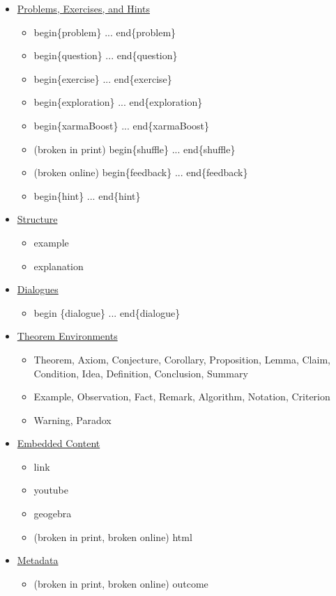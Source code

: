 \documentclass{ximera}
\begin{document}
\begin{remark}
\begin{itemize}
\begin{itemize}
  \end{itemize}
\item \hyperref[ProblemContainers]{Problems, Exercises, and Hints}
  \begin{itemize}
    \item begin\{problem\} ... end\{problem\}
    \item begin\{question\} ... end\{question\}
    \item begin\{exercise\} ... end\{exercise\}
    \item begin\{exploration\} ... end\{exploration\}
    \item begin\{xarmaBoost\} ... end\{xarmaBoost\}
    \item (broken in print) begin\{shuffle\} ... end\{shuffle\}
    \item (broken online) begin\{feedback\} ... end\{feedback\}
    \item begin\{hint\} ... end\{hint\}
  \end{itemize}
\item \hyperref[StructuralEnvironments]{Structure}
  \begin{itemize}
    \item example
    \item explanation
  \end{itemize}
\item \hyperref[Dialogue]{Dialogues}
  \begin{itemize}
    \item begin \{dialogue\} ... end\{dialogue\}
  \end{itemize}
\item \hyperref[TheoremEnvironments]{Theorem Environments}
  \begin{itemize}
    \item Theorem, Axiom, Conjecture, Corollary, Proposition, Lemma, Claim, Condition, Idea, Definition, Conclusion, Summary
    \item Example, Observation, Fact, Remark, Algorithm, Notation, Criterion
    \item Warning, Paradox
  \end{itemize}
\item \hyperref[EmbeddedContent]{Embedded Content}
  \begin{itemize}
    \item link
    \item youtube
    \item geogebra
    \item (broken in print, broken online) html
  \end{itemize}
\item \hyperref[Metadata]{Metadata}
  \begin{itemize}
    \item (broken in print, broken online) outcome
  \end{itemize}

\end{itemize}

\end{remark}
\end{document}
